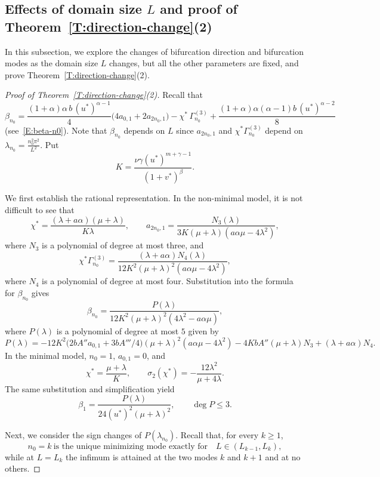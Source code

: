 \documentclass[11pt]{article} %
\theoremstyle{remark}
\theoremstyle{remark}
\numberwithin{equation}{section}
\numberwithin{figure}{section}
\numberwithin{table}{section}
\begin{document}
\subsection{Effects of domain size $L$ and proof of Theorem~\ref{T:direction-change}(2)}
\label{SS:beta-analysis-1}


In this subsection, we explore the changes of bifurcation direction and
bifurcation modes as the domain size $L$ changes, but all the other parameters
are fixed, and prove Theorem~\ref{T:direction-change}(2).

\begin{proof}[Proof of
  Theorem~\ref{T:direction-change}(2)]

  Recall that
  \[
    \beta_{n_0}
    = \frac{(1+\alpha)\alpha\,b\,(u^*)^{\alpha-1}}{4}
    \bigl(4a_{0,1} + 2a_{2n_0,1}\bigr)
    - \chi^*\,\Gamma_{n_0}^{(3)}
    + \frac{(1+\alpha)\alpha(\alpha-1)b\,(u^*)^{\alpha-2}}{8}
  \]
  (see~\eqref{E:beta-n0}). Note that $\beta_{n_0}$ depends on $L$ since
  $a_{2n_0,1}$ and $\chi^*\Gamma_{n_0}^{(3)}$ depend on $\lambda_{n_0} =
  \frac{n_0^2\pi^2}{L^2}$. Put
  \[
    K=\frac{\nu\gamma(u^*)^{m+\gamma-1}}{(1+v^*)^\beta}.
  \]

  We first establish the rational representation. In the non-minimal model, it is not difficult to see that
  \[
    \chi^*=\frac{(\lambda+a\alpha)(\mu+\lambda)}
    {K\lambda},
    \qquad
    a_{2n_0,1}
    =\frac{N_3(\lambda)}
    {3K(\mu+\lambda)(a\alpha\mu-4\lambda^2)},
  \]
  where $N_3$ is a polynomial of degree at most three, and
  \[
    \chi^*\Gamma_{n_0}^{(3)}
    =\frac{(\lambda+a\alpha)N_4(\lambda)}
    {12K^2(\mu+\lambda)^2(a\alpha\mu-4\lambda^2)},
  \]
  where $N_4$ is a polynomial of degree at most four. Substitution into the
  formula for $\beta_{n_0}$ gives
  \[
    \beta_{n_0}
    =\frac{P(\lambda)}
    {12K^2(\mu+\lambda)^2(4\lambda^2-a\alpha\mu)},
  \]
  where $P(\lambda)$ is a polynomial of degree at most $5$ given by
  \[
    P(\lambda )=-12K^2\big(2bA''a_{0,1}+3bA'''/4\big)
    (\mu+\lambda)^2(a\alpha\mu-4\lambda^2)-4KbA''(\mu+\lambda)N_3+(\lambda+a\alpha)
    N_4.
  \]
  In the minimal model, $n_0 = 1$, $a_{0,1} = 0$, and
  \[
    \chi^*=\frac{\mu+\lambda}{K},
    \qquad
    \sigma_2(\chi^*)=-\frac{12\lambda^2}{\mu+4\lambda}.
  \]
  The same substitution and simplification yield
  \[
    \beta_1
    =\frac{P(\lambda)}{24(u^*)^2(\mu+\lambda)^2},
    \qquad \deg P\le3.
  \]

  Next, we consider the sign changes of $P(\lambda_{n_0})$. Recall that, for
  every $k \ge 1$,
  \begin{equation}\label{E:n0-branch}
    n_0= k\ \text{is the unique minimizing mode exactly for}\quad
    L\in\left(L_{k-1},L_k\right),
  \end{equation}
  while at $L = L_k$ the infimum is attained at the two modes $k$ and $k + 1$
  and at no others.


\end{proof}
\end{document}

